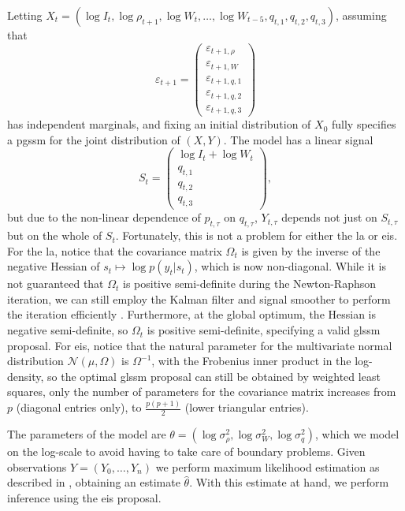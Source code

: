 Letting $X_{t} =\left( \log I_{t}, \log \rho_{t + 1}, \log W_{t}, \dots, \log W_{t - 5}, q_{t,1}, q_{t,2}, q_{t,3}\right)$, assuming that
$$
\varepsilon_{t + 1} = 
\begin{pmatrix}
     \varepsilon_{t + 1,\rho}\\ \varepsilon_{t + 1, W}\\ \varepsilon_{t +1, q, 1}\\ \varepsilon_{t +1, q, 2}\\ \varepsilon_{t +1, q, 3}
\end{pmatrix}
$$
has independent marginals, and fixing an initial distribution of $X_{0}$ fully specifies a \acrshort{pgssm} for the joint distribution of $(X,Y)$. The model has a linear signal 
$$
    S_{t} = \begin{pmatrix}
        \log I_{t} + \log W_{t} \\
        q_{t, 1} \\
        q_{t, 2} \\
        q_{t, 3} 
    \end{pmatrix},
$$
but due to the non-linear dependence of $p_{t,\tau}$ on $q_{t,\tau}$,  $Y_{t,\tau}$ depends not just on $S_{t, \tau}$ but on the whole of $S_{t}$. Fortunately, this is not a problem for either the \acrshort{la} or \acrshort{eis}. For the \acrshort{la}, notice that the covariance matrix $\Omega_{t}$ is given by the inverse of the negative Hessian of $s_{t} \mapsto \log p(y_{t}|s_{t})$, which is now non-diagonal. While it is not guaranteed that $\Omega_{t}$ is positive semi-definite during the Newton-Raphson iteration, we can still employ the Kalman filter and signal smoother to perform the iteration efficiently \citep{Jungbacker2007Monte}. Furthermore, at the global optimum, the Hessian is negative semi-definite, so $\Omega_{t}$ is positive semi-definite, specifying a valid \acrshort{glssm} proposal.  For \acrshort{eis}, notice that the natural parameter for the multivariate normal distribution $\mathcal N(\mu, \Omega)$ is $\Omega^{-1}$, with the Frobenius inner product in the log-density, so the optimal \acrshort{glssm} proposal can still be obtained by weighted least squares, only the number of parameters for the covariance matrix increases from $p$ (diagonal entries only), to $ \frac{p (p +1)}{2}$ (lower triangular entries). 

The parameters of the model are $\theta = \left( \log \sigma^{2}_{\rho}, \log \sigma^{2}_{W}, \log \sigma^{2}_{q} \right)$, which we model on the log-scale to avoid having to take care of boundary problems. Given observations $Y = (Y_{0}, \dots, Y_{n})$ we perform maximum likelihood estimation as described in , obtaining an estimate $\hat\theta$.
With this estimate at hand, we perform inference using the \acrshort{eis} proposal. 
%

